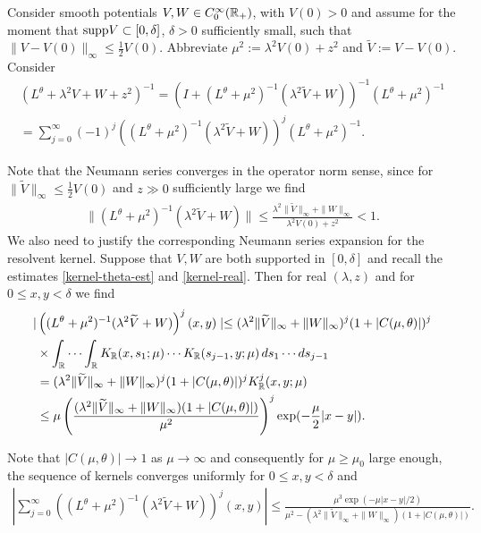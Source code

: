 Consider smooth potentials $V,W\in C^\infty_0 (\mathbb{R}_+)$, 
with $V(0) > 0$ and assume for the moment that $\textup{supp}V \subset [0,\delta]$, $\delta>0$ sufficiently small, 
such that $\| V-V(0) \|_\infty \leq \frac{1}{2}V(0)$.
Abbreviate $\mu^2:= \lambda^2 V(0) + z^2$ and $\widetilde{V}:=V-V(0)$.
Consider 
\begin{align*}
(L^\theta + \lambda^2V + W + z^2)^{-1} =
 (I + (L^\theta + \mu^2)^{-1}(\lambda^2\widetilde{V} + W))^{-1} (L^\theta + \mu^2)^{-1}
\\ = \sum_{j=0}^\infty (-1)^j \left( (L^\theta + \mu^2)^{-1}(\lambda^2\widetilde{V} + W)\right)^j 
(L^\theta + \mu^2)^{-1}.
\end{align*}

Note that the Neumann series converges in the operator norm sense, 
since for $\|\widetilde{V} \|_\infty \leq \frac{1}{2}V(0)$ and $z \gg 0$
sufficiently large we find 
\begin{align*}
 \| (L^\theta + \mu^2)^{-1}(\lambda^2\widetilde{V} + W) \| \leq
\frac{\lambda^2\|\widetilde{V}\|_\infty + \|W\|_\infty}
{\lambda^2 V(0) + z^2} <1.
\end{align*}
We also need to justify the corresponding Neumann series 
expansion for the resolvent kernel. Suppose that $V,W$ 
are both supported in $[0,\delta]$ and recall the estimates 
\eqref{kernel-theta-est} and \eqref{kernel-real}. 
Then for real $(\lambda,z)$ and for $0\leq x,y <\delta$
we find
\begin{align*}
\mid &\left( (L^\theta + \mu^2)^{-1}(\lambda^2\widetilde{V} + W)\right)^j (x,y) \mid \leq 
(\lambda^2\|\widetilde{V}\|_\infty + \|W\|_\infty)^j (1+|C(\mu,\theta)|)^j \\
&\times \int_{\mathbb{R}} \cdots \int_{\mathbb{R}} K_{\mathbb{R}}(x,s_1;\mu) \cdots K_{\mathbb{R}}(s_{j-1},y;\mu) \,
ds_1 \cdots ds_{j-1} \\ & = (\lambda^2\|\widetilde{V}\|_\infty + \|W\|_\infty)^j (1+|C(\mu,\theta)|)^j
K_{\mathbb{R}}^{j}(x,y;\mu) \\
& \leq \mu \left(\frac{(\lambda^2\|\widetilde{V}\|_\infty + \|W\|_\infty) (1+|C(\mu,\theta)|)}
{\mu^2}\right)^j \exp (-\frac{\mu}{2}|x-y|).
\end{align*}

Note that $|C(\mu,\theta)|\to 1$ as $\mu \to \infty$ and consequently 
for $\mu \geq \mu_0$ large enough, the sequence of kernels 
converges uniformly for $0\leq x,y <\delta$ and
\begin{equation}
\label{N-series-est}
 \begin{split}
\left| \sum_{j=0}^\infty \left( (L^\theta + \mu^2)^{-1}(\lambda^2\widetilde{V} + W)\right)^j (x,y) \right| 
\leq \frac{\mu^3 \exp (-\mu|x-y|/2)}{\mu^2 - (\lambda^2\|\widetilde{V}\|_\infty + \|W\|_\infty) (1+|C(\mu,\theta)|)}.
 \end{split}
\end{equation}

